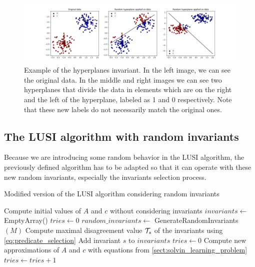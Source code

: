 \begin{figure}[h]
    \centering
    \includegraphics[width=\textwidth]{thesis/Figures/random_hyperplanes_example.png}
    \caption{Example of the hyperplanes invariant. In the left image, we can see the original data. In
    the middle and right images we can see two hyperplanes that divide the data in elements which are
    on the right and the left of the hyperplane, labeled as 1 and 0 respectively. Note that these
    new labels do not necessarily match the original ones.}
    \label{fig:random_hyperplanes_example}
\end{figure}

\subsection{The LUSI algorithm with random invariants}

Because we are introducing some random behavior in the LUSI algorithm, the previously defined algorithm
has to be adapted so that it can operate with these new random invariants, especially the invariants selection process.

\begin{algorithm}
    \caption{Modified version of the LUSI algorithm considering random invariants}
    \label{alg:lusi_random_invariants}
    \begin{algorithmic}[1]
            \State Compute initial values of $A$ and $c$ without considering invariants
            \State $invariants \gets$ EmptyArray()
            \State $tries \gets 0$
                \State $random\_invariants \gets$ GenerateRandomInvariants$(M)$
                \State Compute maximal disagreement value $\mathcal{T}_s$ of the invariants using \ref{eq:predicate_selection}
                    \State Add invariant $s$ to $invariants$
                    \State $tries \gets 0$
                    \State Compute new approximations of $A$ and $c$ with equations from \ref{sect:solvin_learning_problem}
                \Else
                    \State $tries \gets tries + 1$
                \EndIf
            \EndWhile
        \EndFunction
    \end{algorithmic}
\end{algorithm}

